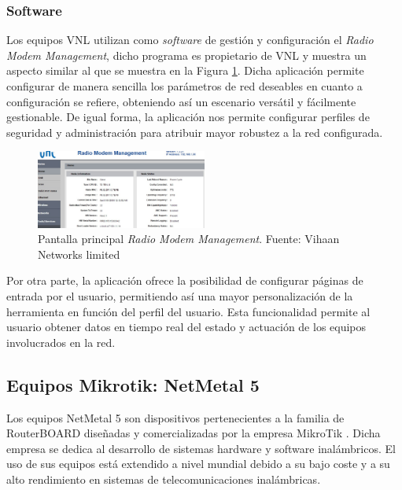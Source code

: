 \subsubsection{Software}
Los equipos VNL utilizan como \textit{software} de gestión y configuración el \textit{Radio Modem Management}, dicho programa es propietario de VNL y muestra un aspecto similar al que se muestra en la Figura \ref{vnl_rm}. Dicha aplicación permite configurar de manera sencilla los parámetros de red deseables en cuanto a configuración se refiere, obteniendo así un escenario versátil y fácilmente gestionable. De igual forma, la aplicación nos permite configurar perfiles de seguridad y administración para atribuir mayor robustez a la red configurada. 

\begin{figure}[H]
		\centering
		\includegraphics[width=0.5\textwidth]{img/vnl_rm.jpg}
		\caption{Pantalla principal \textit{Radio Modem Management}. Fuente: Vihaan Networks limited}
		\label{vnl_rm}
	\end{figure}

Por otra parte, la aplicación ofrece la posibilidad de configurar páginas de entrada por el usuario, permitiendo así una mayor personalización de la herramienta en función del perfil del usuario. Esta funcionalidad permite al usuario obtener datos en tiempo real del estado y actuación de los equipos involucrados en la red. 

\subsection{Equipos Mikrotik: NetMetal 5}
Los equipos NetMetal 5 son dispositivos pertenecientes a la familia de RouterBOARD diseñadas y comercializadas por la empresa MikroTik \cite{Mikrotik}. Dicha empresa se dedica al desarrollo de sistemas hardware y software inalámbricos. El uso de sus equipos está extendido a nivel mundial debido a su bajo coste y a su alto rendimiento en sistemas de telecomunicaciones inalámbricas.
